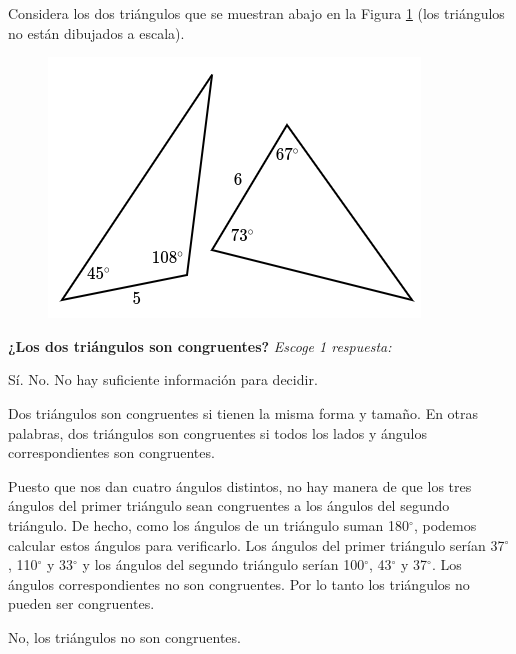 \question[5] Considera los dos triángulos que se muestran abajo en la Figura \ref{fig:20230323153510} (los triángulos no están dibujados a escala).

\begin{figure}[H]
    \includegraphics[width=0.5\linewidth]{../images/20230323153510}
    \caption{}
    \label{fig:20230323153510}
\end{figure}

\textbf{¿Los dos triángulos son congruentes?}
\emph{Escoge 1 respuesta:}

\begin{choices}
    \choice Sí.
    \CorrectChoice No.
    \choice No hay suficiente información para decidir.
\end{choices}

\begin{solutionbox}{5cm}
    Dos triángulos son congruentes si tienen la misma forma y tamaño. En otras palabras, dos triángulos son congruentes si todos los lados y ángulos correspondientes son congruentes.

    Puesto que nos dan cuatro ángulos distintos, no hay manera de que los tres ángulos del primer triángulo sean congruentes a los ángulos del segundo triángulo.
    De hecho, como los ángulos de un triángulo suman 180$^\circ$, podemos calcular estos ángulos para verificarlo. Los ángulos del primer triángulo serían 37$^\circ$, 110$^\circ$ y 33$^\circ$ y los ángulos del segundo triángulo serían 100$^\circ$, 43$^\circ$ y 37$^\circ$.
    Los ángulos correspondientes no son congruentes. Por lo tanto los triángulos no pueden ser congruentes.

    No, los triángulos no son congruentes.
\end{solutionbox}